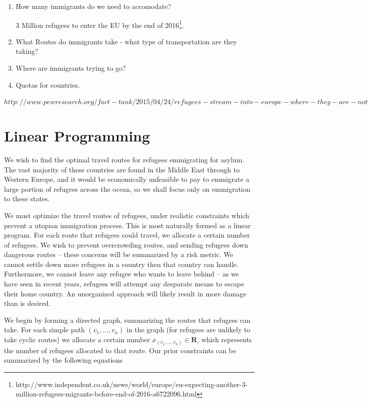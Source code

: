 \documentclass{article}
\begin{document}
\begin{enumerate}
    \item How many immigrants do we need to accomodate?

    3 Million refugees to enter the EU by the end of 2016\footnote{http://www.independent.co.uk/news/world/europe/eu-expecting-another-3-million-refugees-migrants-before-end-of-2016-a6722096.html}.

    \item What Routes do immigrants take - what type of transportation are they taking?

    \item Where are immigrants trying to go?

    \item Quotas for countries.
\end{enumerate}

$http://www.pewresearch.org/fact-tank/2015/04/24/refugees-stream-into-europe-where-they-are-not-welcomed-with-open-arms/ft_15-04-22_eu-immigration/$


\section{Linear Programming}

We wish to find the optimal travel routes for refugees emmigrating for asylum. The vast majority of these countries are found in the Middle East through to Western Europe, and it would be economically unfeasible to pay to emmigrate a large portion of refugees across the ocean, so we shall focus only on emmigration to these states.

We must optimize the travel routes of refugees, under realistic constraints which prevent a utopian immigration process. This is most naturally formed as a linear program. For each route that refugees could travel, we allocate a certain number of refugees. We wish to prevent overcrowding routes, and sending refugees down dangerous routes -- these concerns will be summarized by a risk metric. We cannot settle down more refugees in a country then that country can handle. Furthermore, we cannot leave any refugee who wants to leave behind -- as we have seen in recent years, refugees will attempt any desparate means to escape their home country. An unorganized approach will likely result in more damage than is desired.

We begin by forming a directed graph, summarizing the routes that refugees can take. For each simple path $(v_1, \dots, v_n)$ in the graph (for refugees are unlikely to take cyclic routes) we allocate a certain number $x_{(v_1, \dots, v_n)} \in \mathbf{R}$, which represents the number of refugees allocated to that route. Our prior constraints can be summarized by the following equations
\end{document}
